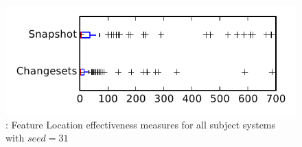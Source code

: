 
\begin{figure}
\centering
\includegraphics[height=0.4\textheight]{figures/flt_seed/rq1_tiny_31}
\caption{\rone: Feature Location effectiveness measures for all subject systems with $seed=31$}
\label{fig:flt_seed:rq1:tiny}
\end{figure}
